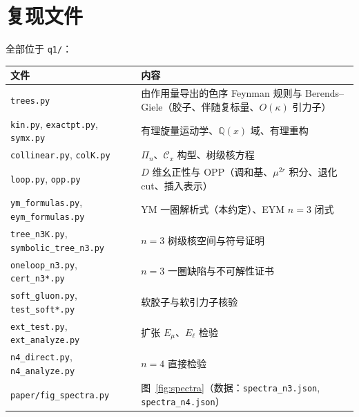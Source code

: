 \documentclass[11pt,a4paper]{ctexart}
\newcommand{\Cx}{\mathcal C_x}
\newcommand{\Q}{\mathbb Q}
\theoremstyle{definition}
\theoremstyle{remark}
\begin{document}
\section{复现文件}\label{app:files}
全部位于 \texttt{q1/}：
\begin{center}\small
\begin{tabularx}{\textwidth}{@{}lX@{}}
\toprule
文件 & 内容 \\ \midrule
\texttt{trees.py} & 由作用量导出的色序 Feynman 规则与 Berends–Giele（胶子、伴随复标量、$O(\kappa)$ 引力子） \\
\texttt{kin.py}, \texttt{exactpt.py}, \texttt{symx.py} & 有理旋量运动学、$\Q(x)$ 域、有理重构 \\
\texttt{collinear.py}, \texttt{colK.py} & $\Pi_n$、$\Cx$ 构型、树级核方程 \\
\texttt{loop.py}, \texttt{opp.py} & $D$ 维幺正性与 OPP（调和基、$\mu^{2r}$ 积分、退化 cut、插入表示） \\
\texttt{ym\_formulas.py}, \texttt{eym\_formulas.py} & YM 一圈解析式（本约定）、EYM $n=3$ 闭式 \\
\texttt{tree\_n3K.py}, \texttt{symbolic\_tree\_n3.py} & $n=3$ 树级核空间与符号证明 \\
\texttt{oneloop\_n3.py}, \texttt{cert\_n3*.py} & $n=3$ 一圈缺陷与不可解性证书 \\
\texttt{soft\_gluon.py}, \texttt{test\_soft*.py} & 软胶子与软引力子核验 \\
\texttt{ext\_test.py}, \texttt{ext\_analyze.py} & 扩张 $E_\mu$、$E_\ell$ 检验 \\
\texttt{n4\_direct.py}, \texttt{n4\_analyze.py} & $n=4$ 直接检验 \\
\texttt{paper/fig\_spectra.py} & 图~\ref{fig:spectra}（数据：\texttt{spectra\_n3.json}, \texttt{spectra\_n4.json}） \\
\bottomrule
\end{tabularx}
\end{center}
\end{document}
